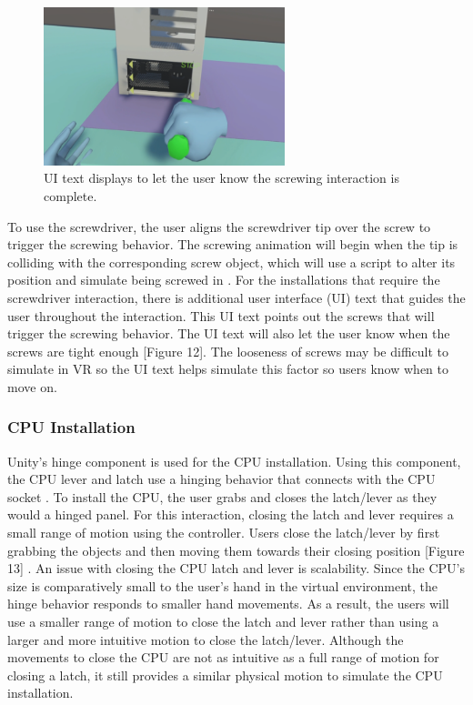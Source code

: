 \documentclass[10pt,twocolumn]{article}
\begin{document}
\begin{figure}
    \centering
    \includegraphics[width=7cm]{images/ScrewdriverUI2.png}
    \caption{UI text displays to let the user know the screwing interaction is complete.}
\end{figure}

\par To use the screwdriver, the user aligns the screwdriver tip over the screw to trigger the screwing behavior. The screwing animation will begin when the tip is colliding with the corresponding screw object, which will use a script to alter its position and simulate being screwed in \cite{Valem2022HowToVR}. For the installations that require the screwdriver interaction, there is additional user interface (UI) text that guides the user throughout the interaction. This UI text points out the screws that will trigger the screwing behavior. The UI text will also let the user know when the screws are tight enough [Figure 12]. The looseness of screws may be difficult to simulate in VR so the UI text helps simulate this factor so users know when to move on. 

\subsubsection{CPU Installation}

\par Unity’s hinge component is used for the CPU installation. Using this component, the CPU lever and latch use a hinging behavior that connects with the CPU socket \cite{Unity2023HingeJointComponent}. To install the CPU, the user grabs and closes the latch/lever as they would a hinged panel. For this interaction, closing the latch and lever requires a small range of motion using the controller. Users close the latch/lever by first grabbing the objects and then moving them towards their closing position [Figure 13] \cite{Valem2022HowToVR}. An issue with closing the CPU latch and lever is scalability. Since the CPU's size is comparatively small to the user's hand in the virtual environment, the hinge behavior responds to smaller hand movements. As a result, the users will use a smaller range of motion to close the latch and lever rather than using a larger and more intuitive motion to close the latch/lever. Although the movements to close the CPU are not as intuitive as a full range of motion for closing a latch, it still provides a similar physical motion to simulate the CPU installation. 
\end{document}
